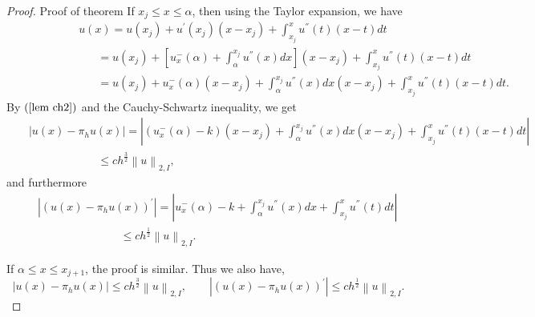 \documentclass[11pt]{article}
\numberwithin{equation}{section}
\begin{document}
\begin{proof}
Proof of theorem If $x_{j}\leq x\leq \alpha$,
then using the Taylor expansion, we have
\begin{eqnarray*}
&&\qquad\qquad~~u(x)=u\left(x_{j}\right)+u^{'}\left(x_{j}\right)\left(x-x_{j}\right)+\int_{x_{j}}^x u^{''}\left(t\right)\left(x-t\right)dt\\
&&~~~\qquad\qquad\quad~~=u\left(x_{j}\right)+\left[u^{-}_{x}\left(\alpha\right)+\int_{\alpha}^{x_{j}} u^{''}\left(x\right)dx\right]\left(x-x_{j}\right)+\int_{x_{j}}^x u^{''}\left(t\right)\left(x-t\right)dt\\
&&~~~\qquad\qquad\quad~~=u\left(x_{j}\right)+u^{-}_{x}\left(\alpha\right)\left(x-x_{j}\right)+\int_{\alpha}^{x_{j}} u^{''}\left(x\right)dx\left(x-x_{j}\right)+\int_{x_{j}}^x u^{''}\left(t\right)\left(x-t\right)dt.
\end{eqnarray*}
By $\left(\ref{lem ch2}\right)$ and the Cauchy-Schwartz inequality, we get
\begin{eqnarray*}
&&\left|u(x)-\pi_{h} u\left(x\right)\right|=\left|\left(u_{x}^{-}\left(\alpha\right)-k\right)\left(x-x_{j}\right)+\int_{\alpha}^{x_{j}} u^{''}\left(x\right)dx\left(x-x_{j}\right)+\int_{x_{j}}^{x} u^{''}\left(t\right)\left(x-t\right)dt\right|\\
&&~~~\qquad\qquad\quad~~\leq c h^{\frac{3}{2}}\left\|u\right\|_{2,I},%
\end{eqnarray*}
and furthermore
\begin{eqnarray*}
&&\left|\left(u\left(x\right)-\pi_{h} u\left(x\right)\right)^{'}\right|=\left|u_{x}^{-}\left(\alpha\right)-k+\int_{\alpha}^{x_{j}}u^{''}\left(x\right)dx+\int_{x_{j}}^{x}u^{''}\left(t\right)dt\right|\\
&&\quad~~~~\qquad\qquad\quad~~\leq ch^{\frac{1}{2}}\left\|u\right\|_{2,I}.
\end{eqnarray*}

If $\alpha \leq x\leq x_{j+1}$, the proof is similar. Thus we also have,
\begin{equation*}
\left|u(x)-\pi_{h} u\left(x\right)\right|\leq c h^{\frac{3}{2}}\left\|u\right\|_{2,I},   \qquad\left|\left(u\left(x\right)-\pi_{h} u\left(x\right)\right)^{'}\right|\leq ch^{\frac{1}{2}}\left\|u\right\|_{2,I}.
\end{equation*}


\end{proof}
\end{document}
